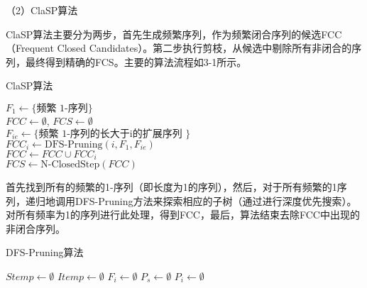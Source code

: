 （2）ClaSP算法

ClaSP算法主要分为两步，首先生成频繁序列，作为频繁闭合序列的候选FCC（Frequent Closed Candidates）。第二步执行剪枝，从候选中剔除所有非闭合的序列，最终得到精确的FCS。主要的算法流程如3-1所示。

\begin{algorithm}
\caption{ClaSP算法}
\begin{algorithmic}
\State $F_1 \gets \{\text{频繁 1-序列}\}$ \\
\State $FCC \gets \emptyset$, $FCS \gets \emptyset$  \\
 {
    \State $F_{ie} \gets \{\text{频繁 1-序列的长大于i的扩展序列 } \}$ \\
    \State $FCC_i \gets \text{DFS-Pruning}(i, F_1, F_{ie})$ \\
    \State $FCC \gets FCC \cup FCC_i$\\}
\EndFor
\State $FCS \gets \text{N-ClosedStep}(FCC)$
\end{algorithmic}
\end{algorithm}


首先找到所有的频繁的1-序列（即长度为1的序列），然后，对于所有频繁的1序列，递归地调用DFS-Pruning方法来探索相应的子树（通过进行深度优先搜索）。对所有频率为1的序列进行此处理，得到FCC，最后，算法结束去除FCC中出现的非闭合序列。


\begin{algorithm}[htbp]
\caption{DFS-Pruning算法}

$Stemp \gets \emptyset$ 
$Itemp \gets \emptyset$ 
$F_i \gets \emptyset$ 
$P_s \gets \emptyset$ 
$P_i \gets \emptyset$ \\
 \\
\end{algorithm}
    

